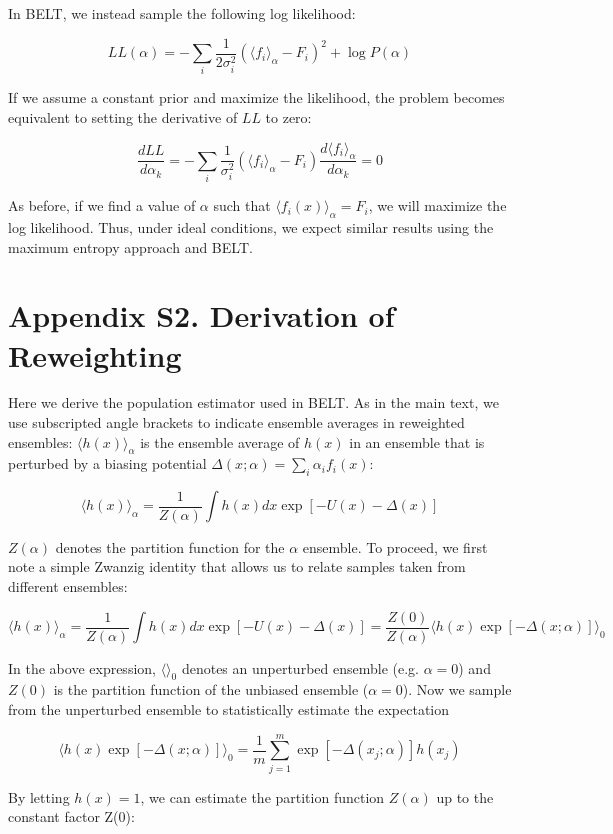\documentclass[12pt]{article}
\begin{document}
In BELT, we instead sample the following log likelihood:

$$LL(\alpha) = -\sum_i \frac{1}{2\sigma_i^2}(\langle f_i\rangle _\alpha - F_i)^2 + \log P(\alpha)$$

If we assume a constant prior and maximize the likelihood, the problem becomes equivalent to setting the derivative of $LL$ to zero:

$$ \frac{dLL}{d\alpha_k} =  -\sum_i \frac{1}{\sigma_i^2} (\langle f_i\rangle _\alpha - F_i) \frac{d\langle f_i\rangle _\alpha}{d\alpha_k} = 0$$

As before, if we find a value of $\alpha$ such that $\langle f_i(x) \rangle_\alpha = F_i$, we will maximize the log likelihood.  Thus, under ideal conditions, we expect similar results using the maximum entropy approach and BELT.  


\newpage

\section*{Appendix S2.  Derivation of Reweighting}

Here we derive the population estimator used in BELT.  As in the main text, we use subscripted angle brackets to indicate ensemble averages in reweighted ensembles: $\langle h(x)\rangle _\alpha$ is the ensemble average of $h(x)$ in an ensemble that is perturbed by a biasing potential $\Delta (x;\alpha) = \sum_i \alpha_i f_i(x)$:

$$\langle h(x)\rangle _\alpha = \frac{1}{Z(\alpha)} \int h(x) dx \exp[ -U(x) - \Delta(x)]$$

$Z(\alpha)$ denotes the partition function for the $\alpha$ ensemble.  To proceed, we first note a simple Zwanzig identity that allows us to relate samples taken from different ensembles:

$$\langle h(x)\rangle _\alpha = \frac{1}{Z(\alpha)} \int h(x) dx \exp[ -U(x) - \Delta(x)] = \frac{Z(0)}{Z(\alpha)} \langle h(x) \exp[-\Delta(x;\alpha)]\rangle _0 $$

In the above expression, $\langle \rangle_0$ denotes an unperturbed ensemble (e.g. $\alpha = 0$) and $Z(0)$ is the partition function of the unbiased ensemble ($\alpha = 0$).  Now we sample from the unperturbed ensemble to statistically estimate the expectation

$$\langle h(x) \exp[-\Delta(x;\alpha)]\rangle _0 = \frac{1}{m} \sum_{j = 1}^{m} \exp [ - \Delta(x_j;\alpha)] h(x_j)$$

By letting $h(x) = 1$, we can estimate the partition function $Z(\alpha)$ up to the constant factor Z(0):
\end{document}
